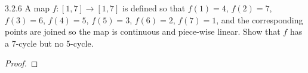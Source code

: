 \begin{problem}{3.2.6}
  A map $f : [1, 7] \to [1, 7]$ is defined so that $f (1) = 4$, $f(2) = 7$, $f(3) = 6$, $f(4) =
5$, $f(5) = 3$, $f(6) = 2$, $f(7) = 1$, and the corresponding points are joined so the map
is continuous and piece-wise linear. Show that $f$ has a 7-cycle but no 5-cycle.
\end{problem}

\begin{proof}
\end{proof}
\newpage
